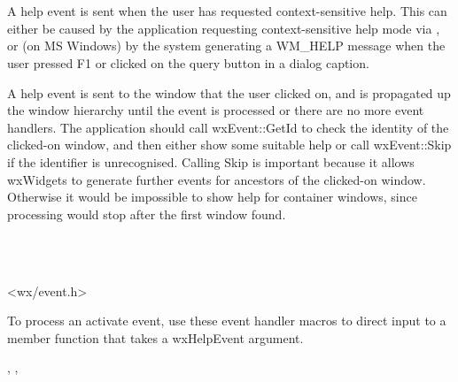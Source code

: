 \section{}\label{wxhelpevent}

A help event is sent when the user has requested context-sensitive help.
This can either be caused by the application requesting
context-sensitive help mode via , or
(on MS Windows) by the system generating a WM\_HELP message when the user pressed F1 or clicked
on the query button in a dialog caption.

A help event is sent to the window that the user clicked on, and is propagated up the
window hierarchy until the event is processed or there are no more event handlers.
The application should call wxEvent::GetId to check the identity of the clicked-on window,
and then either show some suitable help or call wxEvent::Skip if the identifier is unrecognised.
Calling Skip is important because it allows wxWidgets to generate further events for ancestors
of the clicked-on window. Otherwise it would be impossible to show help for container windows,
since processing would stop after the first window found.


\\
\\


<wx/event.h>


To process an activate event, use these event handler macros to direct input to a member
function that takes a wxHelpEvent argument.

\twocolwidtha{7cm}
\begin{twocollist}\itemsep=0pt
\end{twocollist}%


,\rtfsp
{},\rtfsp
{}


